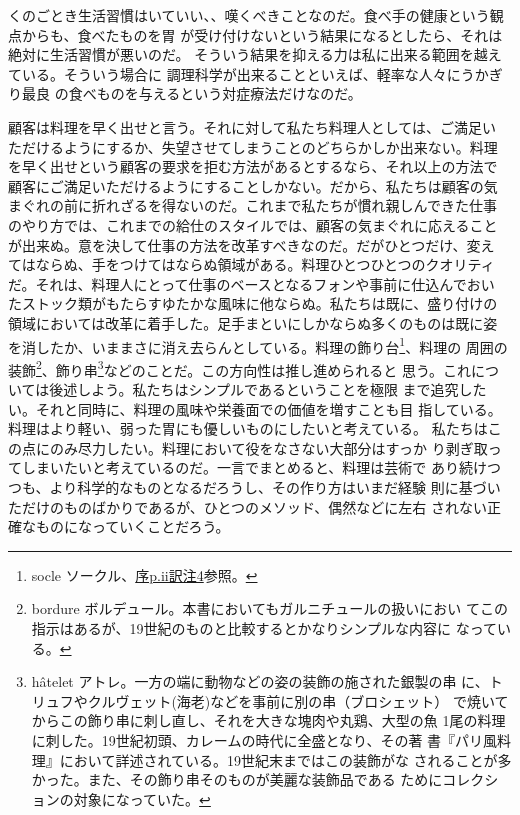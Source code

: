 くのごとき生活習慣はいていい、、嘆くべきことなのだ。食べ手の健康という観点からも、食べたものを胃
が受け付けないという結果になるとしたら、それは絶対に生活習慣が悪いのだ。
そういう結果を抑える力は私に出来る範囲を越えている。そういう場合に
調理科学が出来ることといえば、軽率な人々にうかぎり最良
の食べものを与えるという対症療法だけなのだ。

顧客は料理を早く出せと言う。それに対して私たち料理人としては、ご満足い
ただけるようにするか、失望させてしまうことのどちらかしか出来ない。料理
を早く出せという顧客の要求を拒む方法があるとするなら、それ以上の方法で
顧客にご満足いただけるようにすることしかない。だから、私たちは顧客の気
まぐれの前に折れざるを得ないのだ。これまで私たちが慣れ親しんできた仕事
のやり方では、これまでの給仕のスタイルでは、顧客の気まぐれに応えること
が出来ぬ。意を決して仕事の方法を改革すべきなのだ。だがひとつだけ、変え
てはならぬ、手をつけてはならぬ領域がある。料理ひとつひとつのクオリティ
だ。それは、料理人にとって仕事のベースとなるフォンや事前に仕込んでおい
たストック類がもたらすゆたかな風味に他ならぬ。私たちは既に、盛り付けの
領域においては改革に着手した。足手まといにしかならぬ多くのものは既に姿
を消したか、いままさに消え去らんとしている。料理の飾り台\footnote{socle
  ソークル、\protect\hyperlink{socle}{序p.ii訳注4}参照。}、料理の
周囲の装飾\footnote{bordure
  ボルデュール。本書においてもガルニチュールの扱いにおい
  てこの指示はあるが、19世紀のものと比較するとかなりシンプルな内容に
  なっている。}、飾り串\footnote{hâtelet
  アトレ。一方の端に動物などの姿の装飾の施された銀製の串
  に、トリュフやクルヴェット(海老)などを事前に別の串（ブロシェット）
  で焼いてからこの飾り串に刺し直し、それを大きな塊肉や丸鶏、大型の魚
  1尾の料理に刺した。19世紀初頭、カレームの時代に全盛となり、その著
  書『パリ風料理』において詳述されている。19世紀末まではこの装飾がな
  されることが多かった。また、その飾り串そのものが美麗な装飾品である
  ためにコレクションの対象になっていた。}などのことだ。この方向性は推し進められると
思う。これについては後述しよう。私たちはシンプルであるということを極限
まで追究したい。それと同時に、料理の風味や栄養面での価値を増すことも目
指している。料理はより軽い、弱った胃にも優しいものにしたいと考えている。
私たちはこの点にのみ尽力したい。料理において役をなさない大部分はすっか
り剥ぎ取ってしまいたいと考えているのだ。一言でまとめると、料理は芸術で
あり続けつつも、より科学的なものとなるだろうし、その作り方はいまだ経験
則に基づいただけのものばかりであるが、ひとつのメソッド、偶然などに左右
されない正確なものになっていくことだろう。

